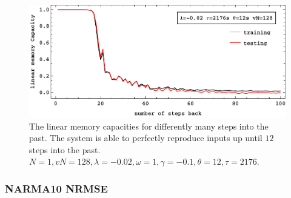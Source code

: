 	\begin{figure}
	\centering
	\includegraphics[width=0.99\linewidth]{pics/linearMemoryCurveN1}
	\caption{The linear memory capacities for differently many steps into the past. The system is able to perfectly reproduce inputs up until $12$ steps into the past. $N=1, vN=128, \lambda=-0.02, \omega=1, \gamma=-0.1, \theta=12, \tau=2176$. }
	\label{fig:linearMemoryRecallCurveN1}
	\end{figure}


\subsubsection{NARMA10 NRMSE}

	

